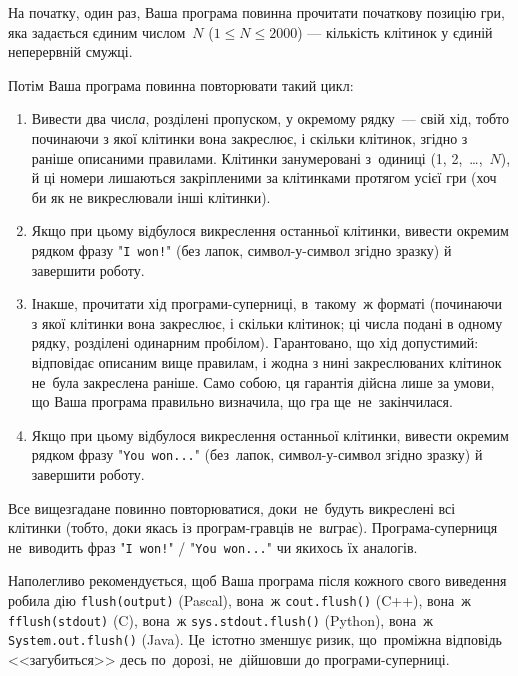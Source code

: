 \Interaction

На початку, один раз, Ваша програма повинна прочитати початкову позицію гри, яка задається єдиним числом~$N$ ($1\leqslant N\leqslant 2000$) --- кількість клітинок у єдиній неперервній смужці.

Потім Ваша програма повинна повторювати такий цикл:
\begin{enumerate}
\item
Вивести два числ{\it а}, розділені пропуском, у окремому рядку~--- свій хід, тобто починаючи з якої клітинки вона закреслює, і скільки клітинок, згідно з раніше описаними правилами.
Клітинки занумеровані з~одиниці (1, 2,~\dots,~$N$), й ці номери лишаються закріпленими за клітинками протягом усієї гри (хоч би як не викреслювали інші клітинки).

\item
Якщо при цьому відбулося викреслення останньої клітинки, 
вивести окремим рядком фразу "\texttt{I~won!}"
(без лапок, символ-у-символ згідно зразку) й завершити роботу.
\item
Інакше, прочитати хід програми-суперниці, в~такому~ж форматі (починаючи з якої клітинки вона закреслює, і скільки клітинок; ці числа подані в одному рядку, розділені одинарним пробілом).
Гарантовано, що хід допустимий: відповідає описаним вище правилам, і жодна з нині закреслюваних клітинок не~була закреслена раніше.
Само собою, ця гарантія дійсна лише за умови, що Ваша програма правильно визначила, що гра ще~не~закінчилася.
\item
Якщо при цьому відбулося викреслення останньої клітинки, 
вивести окремим рядком фразу "\texttt{You~won...}"
(без~лапок, символ-у-символ згідно зразку) й завершити роботу.
\end{enumerate}
Все вищезгадане повинно повторюватися, доки~не~будуть викреслені всі клітинки 
(тобто, доки якась із програм-гравців не~в{\it и}грає).
Програма-суперниця не~виводить фраз "\texttt{I~won!}" / "\texttt{You~won...}"
чи якихось їх аналогів.

Наполегливо рекомендується, щоб Ваша програма після кожного свого виведення 
робила дію \verb"flush(output)" (Pascal), 
вона~ж \verb"cout.flush()" (C++), 
вона~ж \verb"fflush(stdout)" (C), 
вона~ж \verb"sys.stdout.flush()" (Python),
вона~ж \verb"System.out.flush()" (Java).
Це~істотно зменшує ризик, 
що~проміжна відповідь <<загубиться>> десь по~дорозі, 
не~дійшовши до програми-суперниці.




\Examples

\begin{example}
\end{example}



